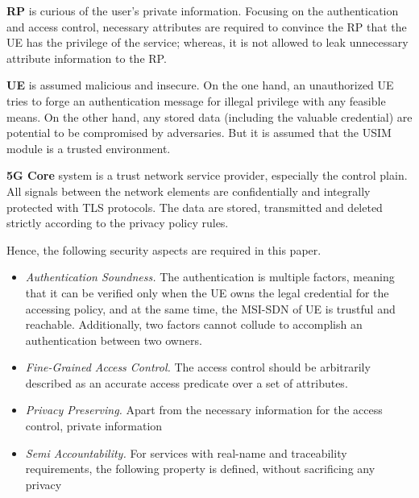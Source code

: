 \textbf{RP} is curious of the user's private information. Focusing on the authentication and access control, necessary attributes are required to convince the RP that the UE has the privilege of the service; whereas, it is not allowed to leak unnecessary attribute information to the RP. 

\textbf{UE} is assumed malicious and insecure. On the one hand, an unauthorized UE tries to forge an authentication message for illegal privilege with any feasible means. On the other hand, any stored data (including the valuable credential) are potential to be compromised by adversaries. But it is assumed that the USIM module is a trusted environment. 

\textbf{5G Core} system is a trust network service provider, especially the control plain. All signals between the network elements are confidentially and integrally protected with TLS protocols. The data are stored, transmitted and deleted strictly according to the privacy policy rules.

Hence, the following security aspects are required in this paper.

\begin{itemize}
	\item \textit{Authentication Soundness.} 
	The authentication is multiple factors, meaning that it can be verified only when the UE owns the legal credential for the accessing policy, and at the same time, the MSI-SDN of UE is trustful and reachable. Additionally, two factors cannot collude to accomplish an authentication between two owners.
	\item \textit{Fine-Grained Access Control.} The access control should be arbitrarily described as an accurate access predicate over a set of attributes.
	\item \textit{Privacy Preserving.} Apart from the necessary information for the access control, private information 
	\item \textit{Semi Accountability.} For services with real-name and traceability requirements, the following property is defined, without sacrificing any privacy 
\end{itemize}

